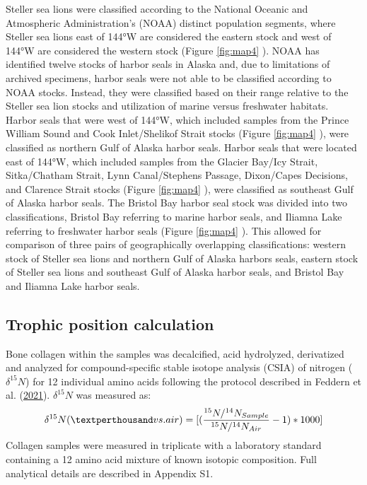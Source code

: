 \documentclass [11pt, proquest] {uwthesis}[2015/03/03]
\begin{document}
Steller sea lions were classified according to the National Oceanic and
Atmospheric Administration's (NOAA) distinct population segments, where
Steller sea lions east of 144°W are considered the eastern stock and
west of 144°W are considered the western stock (Figure \ref{fig:map4} ).
NOAA has identified twelve stocks of harbor seals in Alaska and, due to
limitations of archived specimens, harbor seals were not able to be
classified according to NOAA stocks. Instead, they were classified based
on their range relative to the Steller sea lion stocks and utilization
of marine versus freshwater habitats. Harbor seals that were west of
144°W, which included samples from the Prince William Sound and Cook
Inlet/Shelikof Strait stocks (Figure \ref{fig:map4} ), were classified
as northern Gulf of Alaska harbor seals. Harbor seals that were located
east of 144°W, which included samples from the Glacier Bay/Icy Strait,
Sitka/Chatham Strait, Lynn Canal/Stephens Passage, Dixon/Capes
Decisions, and Clarence Strait stocks (Figure \ref{fig:map4} ), were
classified as southeast Gulf of Alaska harbor seals. The Bristol Bay
harbor seal stock was divided into two classifications, Bristol Bay
referring to marine harbor seals, and Iliamna Lake referring to
freshwater harbor seals (Figure \ref{fig:map4} ). This allowed for
comparison of three pairs of geographically overlapping classifications:
western stock of Steller sea lions and northern Gulf of Alaska harbors
seals, eastern stock of Steller sea lions and southeast Gulf of Alaska
harbor seals, and Bristol Bay and Iliamna Lake harbor seals.

\subsection{Trophic position
calculation}\label{trophic-position-calculation}

Bone collagen within the samples was decalcified, acid hydrolyzed,
derivatized and analyzed for compound-specific stable isotope analysis
(CSIA) of nitrogen (\(\delta^{15}N\)) for 12 individual amino acids
following the protocol described in Feddern et al.
(\protect\hyperlink{ref-Feddern2021}{2021}). \(\delta^{15}N\) was
measured as:
\begin{equation} 
  \delta^{15}N ( \textperthousand vs. air) =   
  [(\frac{^{15}N/^{14}N_{Sample}}{^{15}N/^{14}N_{Air}} -1)*1000]
  \label{eq:deltN2}
\end{equation}
Collagen samples were measured in triplicate with a laboratory standard
containing a 12 amino acid mixture of known isotopic composition. Full
analytical details are described in Appendix S1.
\end{document}
